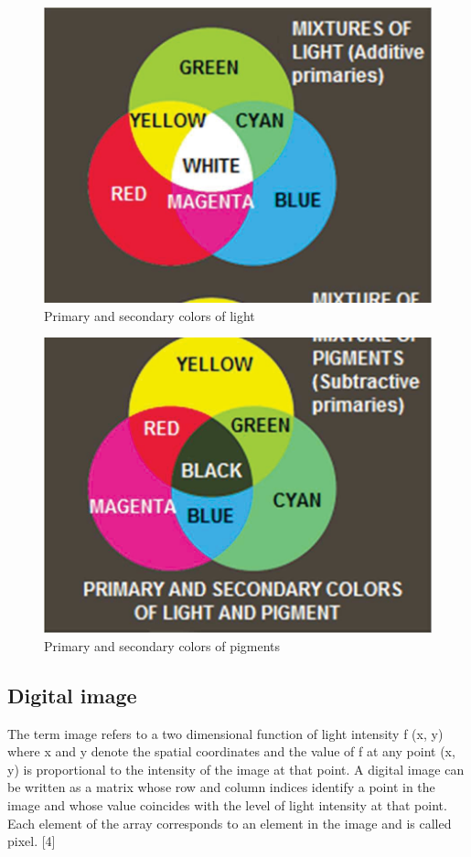 \begin{figure}
  \includegraphics[width=\linewidth]{images/ch2/mixtureLight.jpg}
  \caption{Primary and secondary colors of light}
  \label{fig:mixtureLight}
\end{figure}

\begin{figure}
  \includegraphics[width=\linewidth]{images/ch2/mixturepigment.jpg}
  \caption{Primary and secondary colors of pigments}
  \label{fig:mixturepigment}
\end{figure}


\subsection{Digital image}
The term image refers to a two dimensional function of light intensity f (x, y) where x and y denote the spatial coordinates and the value of f at any point (x, y) is proportional to the intensity of the image at that point. A digital image can be written as a matrix whose row and column indices identify a point in the image and whose value coincides with the level of light intensity at that point. Each element of the array corresponds to an element in the image and is called pixel. [4]

